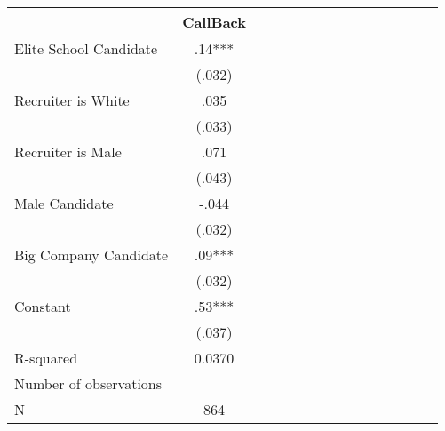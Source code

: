 \begin{tabular}{l*{14}{c}}
                    &    CallBack   \\
\hline
Elite School Candidate&         .14***\\
                    &      (.032)   \\
Recruiter is White  &        .035   \\
                    &      (.033)   \\
Recruiter is Male   &        .071   \\
                    &      (.043)   \\
Male Candidate      &       -.044   \\
                    &      (.032)   \\
Big Company Candidate&         .09***\\
                    &      (.032)   \\
Constant            &         .53***\\
                    &      (.037)   \\
\hline
R-squared           &      0.0370   \\
Number of observations&               \\
N                   &         864   \\
\end{tabular}
